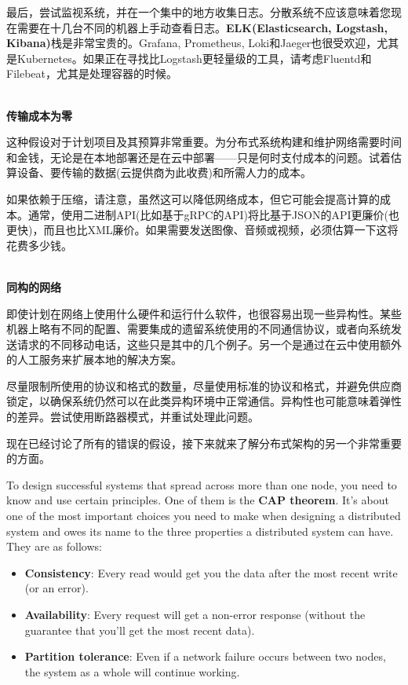 最后，尝试监视系统，并在一个集中的地方收集日志。分散系统不应该意味着您现在需要在十几台不同的机器上手动查看日志。\textbf{ELK(Elasticsearch, Logstash, Kibana)}栈是非常宝贵的。Grafana, Prometheus, Loki和Jaeger也很受欢迎，尤其是Kubernetes。如果正在寻找比Logstash更轻量级的工具，请考虑Fluentd和Filebeat，尤其是处理容器的时候。

\hspace*{\fill} \\ %
\noindent
\textbf{传输成本为零}

这种假设对于计划项目及其预算非常重要。为分布式系统构建和维护网络需要时间和金钱，无论是在本地部署还是在云中部署——只是何时支付成本的问题。试着估算设备、要传输的数据(云提供商为此收费)和所需人力的成本。

如果依赖于压缩，请注意，虽然这可以降低网络成本，但它可能会提高计算的成本。通常，使用二进制API(比如基于gRPC的API)将比基于JSON的API更廉价(也更快)，而且也比XML廉价。如果需要发送图像、音频或视频，必须估算一下这将花费多少钱。

\hspace*{\fill} \\ %
\noindent
\textbf{同构的网络}

即使计划在网络上使用什么硬件和运行什么软件，也很容易出现一些异构性。某些机器上略有不同的配置、需要集成的遗留系统使用的不同通信协议，或者向系统发送请求的不同移动电话，这些只是其中的几个例子。另一个是通过在云中使用额外的人工服务来扩展本地的解决方案。

尽量限制所使用的协议和格式的数量，尽量使用标准的协议和格式，并避免供应商锁定，以确保系统仍然可以在此类异构环境中正常通信。异构性也可能意味着弹性的差异。尝试使用断路器模式，并重试处理此问题。

现在已经讨论了所有的错误的假设，接下来就来了解分布式架构的另一个非常重要的方面。


To design successful systems that spread across more than one node, you need to know and use certain principles. One of them is the \textbf{CAP theorem}. It's about one of the most important choices you need to make when designing a distributed system and owes its name to the three properties a distributed system can have. They are as follows:

\begin{itemize}
\item 
\textbf{Consistency}: Every read would get you the data after the most recent write (or an error).

\item 
\textbf{Availability}: Every request will get a non-error response (without the guarantee that you'll get the most recent data).

\item 
\textbf{Partition tolerance}: Even if a network failure occurs between two nodes, the system as a whole will continue working.
\end{itemize}

